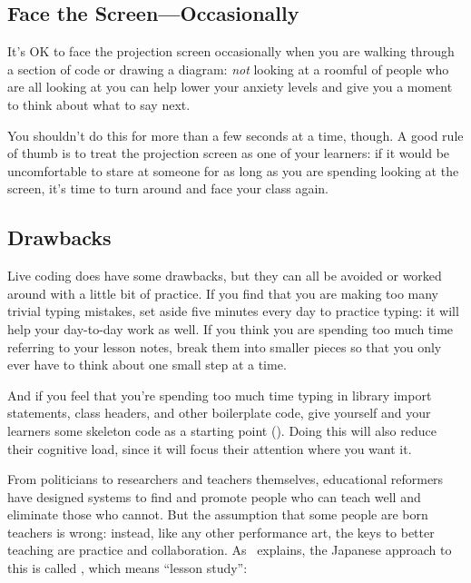 \subsection*{Face the Screen---Occasionally}

It's OK to face the projection screen occasionally
when you are walking through a section of code or drawing a diagram:
\emph{not} looking at a roomful of people who are all looking at you
can help lower your anxiety levels and give you a moment to think about what to say next.

You shouldn't do this for more than a few seconds at a time, though.
A good rule of thumb is to treat the projection screen as one of your learners:
if it would be uncomfortable to stare at someone
for as long as you are spending looking at the screen,
it's time to turn around and face your class again.

\subsection*{Drawbacks}

Live coding does have some drawbacks,
but they can all be avoided or worked around with a little bit of practice.
If you find that you are making too many trivial typing mistakes,
set aside five minutes every day to practice typing:
it will help your day-to-day work as well.
If you think you are spending too much time referring to your lesson notes,
break them into smaller pieces
so that you only ever have to think about one small step at a time.

And if you feel that you're spending too much time typing in library import statements,
class headers,
and other boilerplate code,
give yourself and your learners some skeleton code as a starting point ().
Doing this will also reduce their cognitive load,
since it will focus their attention where you want it.


From politicians to researchers and teachers themselves,
educational reformers have designed systems
to find and promote people who can teach well
and eliminate those who cannot.
But the assumption that some people are born teachers is wrong:
instead,
like any other performance art,
the keys to better teaching are practice and collaboration.
As~\cite{Gree2014} explains,
the Japanese approach to this is called ,
which means ``lesson study'':

